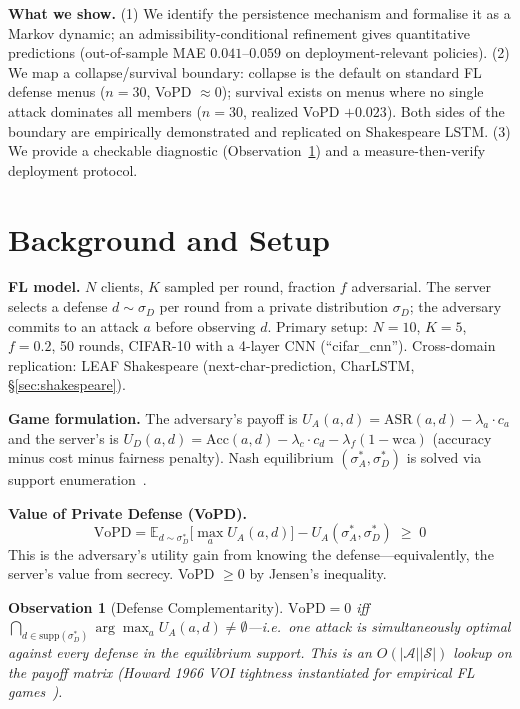 \documentclass{article}
\newtheorem{observation}{Observation}
\newcommand{\UA}{U_A}
\newcommand{\UD}{U_D}
\begin{document}
\textbf{What we show.} (1) We identify the persistence mechanism and formalise it as a Markov dynamic; an admissibility-conditional refinement gives quantitative predictions (out-of-sample MAE $0.041$--$0.059$ on deployment-relevant policies). (2) We map a collapse/survival boundary: collapse is the default on standard FL defense menus ($n=30$, VoPD $\approx 0$); survival exists on menus where no single attack dominates all members ($n=30$, realized VoPD $+0.023$). Both sides of the boundary are empirically demonstrated and replicated on Shakespeare LSTM. (3) We provide a checkable diagnostic (Observation~\ref{obs:complementarity}) and a measure-then-verify deployment protocol.

\section{Background and Setup}
\label{sec:setup}

\textbf{FL model.} $N$ clients, $K$ sampled per round, fraction $f$ adversarial. The server selects a defense $d \sim \sigma_D$ per round from a private distribution $\sigma_D$; the adversary commits to an attack $a$ before observing $d$. Primary setup: $N{=}10$, $K{=}5$, $f{=}0.2$, 50 rounds, CIFAR-10 with a 4-layer CNN (``cifar\_cnn''). Cross-domain replication: LEAF Shakespeare (next-char-prediction, CharLSTM, §\ref{sec:shakespeare}).

\textbf{Game formulation.} The adversary's payoff is $\UA(a,d) = \text{ASR}(a,d) - \lambda_a \cdot c_a$ and the server's is $\UD(a,d) = \text{Acc}(a,d) - \lambda_c \cdot c_d - \lambda_f(1 - \text{wca})$ (accuracy minus cost minus fairness penalty). Nash equilibrium $(\sigma_A^*, \sigma_D^*)$ is solved via support enumeration~\citep{nashpy}.

\textbf{Value of Private Defense (VoPD).}
\begin{equation}
\text{VoPD} = \mathbb{E}_{d \sim \sigma_D^*}\bigl[\max_a \UA(a,d)\bigr] - \UA(\sigma_A^*, \sigma_D^*) \;\geq\; 0
\label{eq:vopd}
\end{equation}
This is the adversary's utility gain from knowing the defense---equivalently, the server's value from secrecy. VoPD $\geq 0$ by Jensen's inequality.

\begin{observation}[Defense Complementarity]
\label{obs:complementarity}
$\text{VoPD} = 0$ iff $\bigcap_{d \in \mathrm{supp}(\sigma_D^*)} \arg\max_a \UA(a,d) \neq \emptyset$---i.e.\ one attack is simultaneously optimal against every defense in the equilibrium support. This is an $O(|\mathcal{A}||\mathcal{S}|)$ lookup on the payoff matrix (Howard 1966 VOI tightness instantiated for empirical FL games~\citep{howard1966information}).
\end{observation}
\end{document}
